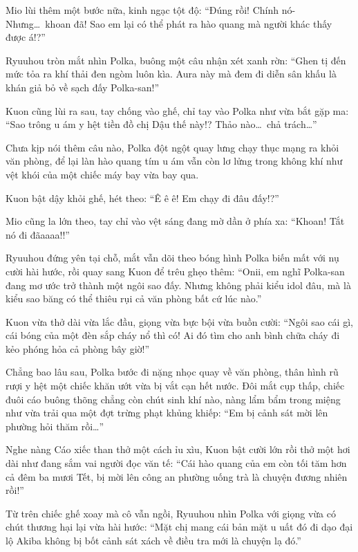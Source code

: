 \documentclass[../main.tex]{subfiles}
\begin{document}

Mio lùi thêm một bước nữa, kinh ngạc tột độ: ``Đúng rồi! Chính nó- Nhưng\dots\ khoan đã! Sao em lại có thể phát ra hào quang mà người khác thấy được á!?''

Ryuuhou tròn mắt nhìn Polka, buông một câu nhận xét xanh rờn: ``Ghen tị đến mức tỏa ra khí thải đen ngòm luôn kìa. Aura này mà đem đi diễn sân khấu là khán giả bỏ về sạch đấy Polka-san!''

Kuon cũng lùi ra sau, tay chống vào ghế, chỉ tay vào Polka như vừa bắt gặp ma: ``Sao trông u ám y hệt tiền đồ chị Dậu thế này!? Thảo nào\dots\ chả trách\dots''

Chưa kịp nói thêm câu nào, Polka đột ngột quay lưng chạy thục mạng ra khỏi văn phòng, để lại làn hào quang tím u ám vẫn còn lơ lửng trong không khí như vệt khói của một chiếc máy bay vừa bay qua.

Kuon bật dậy khỏi ghế, hét theo: ``Ê ê ê! Em chạy đi đâu đấy!?''

Mio cũng la lớn theo, tay chỉ vào vệt sáng đang mờ dần ở phía xa: ``Khoan! Tắt nó đi đãaaaa!!''

Ryuuhou đứng yên tại chỗ, mắt vẫn dõi theo bóng hình Polka biến mất với nụ cười hài hước, rồi quay sang Kuon để trêu ghẹo thêm: ``Onii, em nghĩ Polka-san đang mơ ước trở thành một ngôi sao đấy. Nhưng không phải kiểu idol đâu, mà là kiểu sao băng có thể thiêu rụi cả văn phòng bất cứ lúc nào.''

Kuon vừa thở dài vừa lắc đầu, giọng vừa bực bội vừa buồn cười: ``Ngôi sao cái gì, cái bóng của một đèn sắp cháy nổ thì có! Ai đó tìm cho anh bình chữa cháy đi kẻo phóng hỏa cả phòng bây giờ!''

\ct

Chẳng bao lâu sau, Polka bước đi nặng nhọc quay về văn phòng, thân hình rũ rượi y hệt một chiếc khăn ướt vừa bị vắt cạn hết nước. Đôi mắt cụp thấp, chiếc đuôi cáo buông thõng chẳng còn chút sinh khí nào, nàng lẩm bẩm trong miệng như vừa trải qua một đợt trừng phạt khủng khiếp: ``Em bị cảnh sát mời lên phường hỏi thăm rồi\dots''

Nghe nàng Cáo xiếc than thở một cách ỉu xìu, Kuon bật cười lớn rồi thở một hơi dài như đang sắm vai người đọc văn tế: ``Cái hào quang của em còn tối tăm hơn cả đêm ba mươi Tết, bị mời lên công an phường uống trà là chuyện đương nhiên rồi!''

Từ trên chiếc ghế xoay mà cô vẫn ngồi, Ryuuhou nhìn Polka với giọng vừa có chút thương hại lại vừa hài hước: ``Mặt chị mang cái bản mặt u uất đó đi dạo đại lộ Akiba không bị bốt cảnh sát xách về điều tra mới là chuyện lạ đó.''
\end{document}
